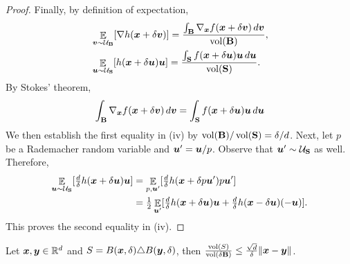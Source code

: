 \begin{proof}
Finally, by definition of expectation,
\begin{align*}
    &\E_{\vecv\sim\calU_\bfB}[\nabla h(\vecx+\delta\vecv)] = \frac{\int_{\bfB}\nabla_\vecx f(\vecx+\delta\vecv) \, d\vecv}{\vol(\bfB)}, \\
    &\E_{\vecu\sim\calU_\bfS}[h(\vecx+\delta\vecu)\vecu] = \frac{\int_{\bfS} f(\vecx+\delta\vecu) \vecu \, d\vecu}{\vol(\bfS)}.
\end{align*}
By Stokes' theorem,
\begin{align*}
    \int_{\bfB} \nabla_\vecx f(\vecx+\delta\vecv) \, d\vecv 
    = \int_{\bfS} f(\vecx+\delta\vecu)\vecu \, d\vecu 
\end{align*}
We then establish the first equality in (iv) by $\vol(\bfB)/\vol(\bfS) = \delta/d$. Next, let $p$ be a Rademacher random variable and $\vecu'=\vecu/p$. Observe that $\vecu'\sim\calU_\bfS$ as well. Therefore,
\begin{align*}
    \E_{\vecu\sim\calU_\bfS}[ \tfrac{d}{\delta} h(\vecx+\delta\vecu)\vecu ] 
    &= \E_{p,\vecu'}[ \tfrac{d}{\delta} h(\vecx+\delta p\vecu')p\vecu' ] \\
    &= \tfrac{1}{2} \E_{\vecu'}[ \tfrac{d}{\delta} h(\vecx+\delta\vecu)\vecu + \tfrac{d}{\delta} h(\vecx-\delta\vecu)(-\vecu) ].
\end{align*}
This proves the second equality in (iv).
\end{proof}

\begin{lemma}
\label{lem-aux:DP-O2NC:volume}
Let $\vecx,\vecy\in\RR^d$ and $S=B(\vecx,\delta)\triangle B(\vecy,\delta)$, then $\frac{\vol(S)}{\vol(\delta\bfB)} \le \frac{\sqrt{d}}{\delta}\|\vecx-\vecy\|$.
\end{lemma}

